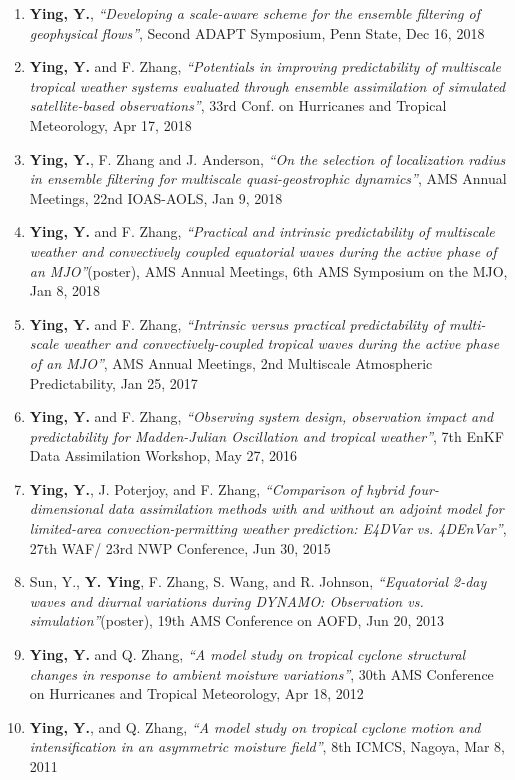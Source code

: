 \begin{enumerate}
\item \textbf{Ying, Y.},
\textit{``Developing a scale-aware scheme for the ensemble filtering of geophysical flows''},
Second ADAPT Symposium, Penn State, Dec 16, 2018

\item \textbf{Ying, Y.} and F. Zhang,
\textit{``Potentials in improving predictability of multiscale tropical weather systems evaluated through ensemble assimilation of simulated satellite-based observations''},
33rd Conf. on Hurricanes and Tropical Meteorology, Apr 17, 2018

\item \textbf{Ying, Y.}, F. Zhang and J. Anderson,
\textit{``On the selection of localization radius in ensemble filtering for multiscale quasi-geostrophic dynamics''},
AMS Annual Meetings, 22nd IOAS-AOLS, Jan 9, 2018

\item \textbf{Ying, Y.} and F. Zhang,
\textit{``Practical and intrinsic predictability of multiscale weather and convectively coupled equatorial waves during the active phase of an MJO''}(poster),
AMS Annual Meetings, 6th AMS Symposium on the MJO, Jan 8, 2018

\item \textbf{Ying, Y.} and F. Zhang,
\textit{``Intrinsic versus practical predictability of multi-scale weather and convectively-coupled tropical waves during the active phase of an MJO''},
AMS Annual Meetings, 2nd Multiscale Atmospheric Predictability, Jan 25, 2017

\item \textbf{Ying, Y.} and F. Zhang,
\textit{``Observing system design, observation impact and predictability for Madden-Julian Oscillation and tropical weather''},
7th EnKF Data Assimilation Workshop, May 27, 2016

\item \textbf{Ying, Y.}, J. Poterjoy, and F. Zhang,
\textit{``Comparison of hybrid four-dimensional data assimilation methods with and without an adjoint model for limited-area convection-permitting weather prediction: E4DVar vs. 4DEnVar''},
27th WAF/ 23rd NWP Conference, Jun 30, 2015

\item Sun, Y., \textbf{Y. Ying}, F. Zhang, S. Wang, and R. Johnson,
\textit{``Equatorial 2-day waves and diurnal variations during DYNAMO: Observation vs. simulation''}(poster),
19th AMS Conference on AOFD, Jun 20, 2013

\item \textbf{Ying, Y.} and Q. Zhang,
\textit{``A model study on tropical cyclone structural changes in response to ambient moisture variations''},
30th AMS Conference on Hurricanes and Tropical Meteorology, Apr 18, 2012

\item \textbf{Ying, Y.}, and Q. Zhang,
\textit{``A model study on tropical cyclone motion and intensification in an asymmetric moisture field''},
8th ICMCS, Nagoya, Mar 8, 2011

\end{enumerate}
